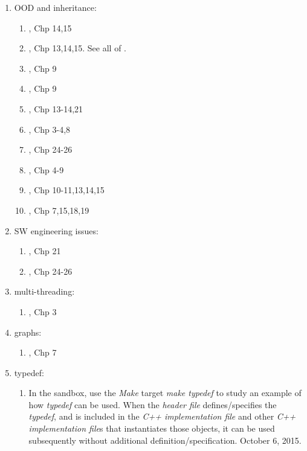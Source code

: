 \begin{enumerate}
\begin{enumerate}
	\item 
	\end{enumerate}
\item OOD and inheritance: \vspace{-0.3cm}
	\begin{enumerate} \itemsep -2pt
	\item \cite{Eckel2000}, Chp 14,15
	\item \cite{Gaddis2010}, Chp 13,14,15. See all of \cite{Gaddis2010,Gaddis2011,Gaddis2012}.
	\item \cite{Stroustrup2014}, Chp 9
	\item \cite{Stroustrup2009}, Chp 9
	\item \cite{Oualline2003}, Chp 13-14,21
	\item \cite{Vermeir2001}, Chp 3-4,8
	\item \cite{Allain2012}, Chp 24-26
	\item \cite{Gregoire2014}, Chp 4-9
	\item \cite{Prata2012}, Chp 10-11,13,14,15
	\item \cite{Lippman2013}, Chp 7,15,18,19
	\end{enumerate}
\item SW engineering issues: \vspace{-0.3cm}
	\begin{enumerate} \itemsep -2pt
	\item \cite{Allain2012}, Chp 21
	\item \cite{Gregoire2014}, Chp 24-26
	\end{enumerate}
\item multi-threading: \vspace{-0.3cm}
	\begin{enumerate} \itemsep -2pt
	\item \cite{Schildt2004a}, Chp 3
	\end{enumerate}
\item graphs: \vspace{-0.3cm}
	\begin{enumerate} \itemsep -2pt
	\item \cite{Schildt2004a}, Chp 7
	\end{enumerate}
\item typedef: \vspace{-0.3cm}
	\begin{enumerate} \itemsep -2pt
	\item In the sandbox, use the {\it Make} target {\it make typedef} to study an example of how {\it typedef} can be used. When the {\it header file} defines/specifies the {\it typedef}, and is included in the {\it C++ implementation file} and other {\it C++ implementation file}s that instantiates those objects, it can be used subsequently without additional definition/specification. October 6, 2015.
	\end{enumerate}
\end{enumerate}


